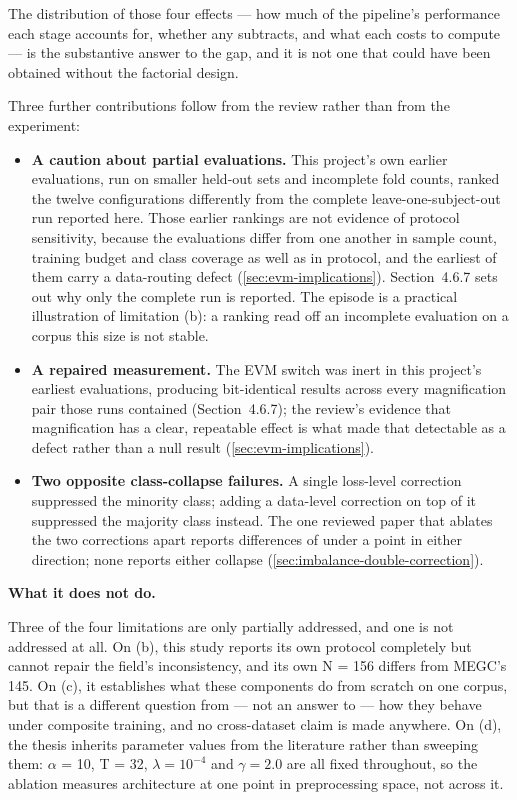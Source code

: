 The distribution of those four effects --- how much of the pipeline's performance each stage accounts for, whether any subtracts, and what each costs to compute --- is the substantive answer to the gap, and it is not one that could have been obtained without the factorial design.

Three further contributions follow from the review rather than from the experiment:

\begin{itemize}
	\item \textbf{A caution about partial evaluations.} This project's own earlier evaluations, run on smaller held-out sets and incomplete fold counts, ranked the twelve configurations differently from the complete leave-one-subject-out run reported here. Those earlier rankings are not evidence of protocol sensitivity, because the evaluations differ from one another in sample count, training budget and class coverage as well as in protocol, and the earliest of them carry a data-routing defect (\autoref{sec:evm-implications}). Section~4.6.7 sets out why only the complete run is reported. The episode is a practical illustration of limitation (b): a ranking read off an incomplete evaluation on a corpus this size is not stable.
	\item \textbf{A repaired measurement.} The EVM switch was inert in this project's earliest evaluations, producing bit-identical results across every magnification pair those runs contained (Section~4.6.7); the review's evidence that magnification has a clear, repeatable effect is what made that detectable as a defect rather than a null result (\autoref{sec:evm-implications}).
	\item \textbf{Two opposite class-collapse failures.} A single loss-level correction suppressed the minority class; adding a data-level correction on top of it suppressed the majority class instead. The one reviewed paper that ablates the two corrections apart reports differences of under a point in either direction; none reports either collapse (\autoref{sec:imbalance-double-correction}).
\end{itemize}

\textbf{What it does not do.}

Three of the four limitations are only partially addressed, and one is not addressed at all. On (b), this study reports its own protocol completely but cannot repair the field's inconsistency, and its own N = 156 differs from MEGC's 145. On (c), it establishes what these components do from scratch on one corpus, but that is a different question from --- not an answer to --- how they behave under composite training, and no cross-dataset claim is made anywhere. On (d), the thesis inherits parameter values from the literature rather than sweeping them: $\alpha$ = 10, T = 32, $\lambda = 10^{-4}$ and $\gamma = 2.0$ are all fixed throughout, so the ablation measures architecture at one point in preprocessing space, not across it.

